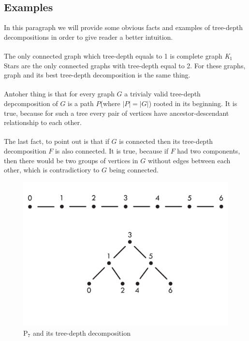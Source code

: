 \subsection{Examples}
In this paragraph we will provide some obvious facts and examples of tree-depth decompositions in order to give reader a better intuition.\\\\
The only connected graph which tree-depth equals to 1 is complete graph \emph{K$_{1}$}\\
Stars are the only connected graphs with tree-depth equal to 2.  For these graphs, graph and its best tree-depth decomposition is the same thing.\\\\
Antoher thing is that for every graph $G$ a trivialy valid tree-depth depcomposition of $G$ is a path $P$(where $|P|=|G|$) rooted in its beginning. It is true, because for such a tree every pair of vertices have ancestor-descendant relationship to each other.\\\\
The last fact, to point out is that if $G$ is connected then its tree-depth decomposition $F$ is also connected. It is true, because if $F$ had two components, then there would be two groups of vertices in $G$ without edges between each other, which is contradictiory to $G$ being connected.
\begin{figure}[hbt!]
	\centering
	\includegraphics[scale=0.5,valign=t]{sciezka.pdf}
	\caption{P$_{7}$ and its tree-depth decomposition}
\end{figure}
\\\\\\\\

